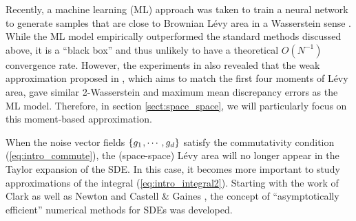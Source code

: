 \documentclass[sn-mathphys-num]{sn-jnl}%
\newcommand{\m}{\hspace{0.25mm}}
\begin{document}
Recently, a machine learning (ML) approach was taken to train a neural network to generate samples that are close to Brownian L\'{e}vy area in a Wasserstein sense \cite{jelincic2025levygan}. While the ML model empirically outperformed the standard methods discussed above, it is a ``black box'' and thus unlikely to have a theoretical $O(N^{-1})$ convergence rate.
However, the experiments in \cite{jelincic2025levygan} also revealed that the weak approximation proposed in \cite[Definition 7.3.5]{foster2020thesis}, which aims to match the first four moments of L\'{e}vy area, gave similar 2-Wasserstein and maximum mean discrepancy errors as the ML model. 
Therefore, in section \ref{sect:space_space}, we will particularly focus on this moment-based approximation.\medbreak

When the noise vector fields $\{g_1\m,\cdots, g_d\}$ satisfy the commutativity condition (\ref{eq:intro_commute}), the  (space-space) L\'{e}vy area will no longer appear in the Taylor expansion of the SDE. In this case, it becomes more important to study approximations of the integral (\ref{eq:intro_integral2}).
Starting with the work of Clark \cite{clark1982efficient} as well as Newton \cite{newton1991efficient} and Castell \& Gaines \cite{castell1996efficient}, the concept of ``asymptotically efficient'' numerical methods for SDEs was developed.
\end{document}
